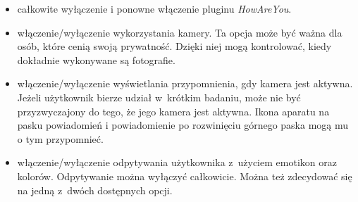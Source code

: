 \begin{itemize}
	\item całkowite wyłączenie i ponowne włączenie pluginu \textit{HowAreYou}.
	
	\item włączenie/wyłączenie wykorzystania kamery. Ta opcja może być ważna dla osób, które cenią swoją prywatność. Dzięki niej mogą kontrolować, kiedy dokładnie wykonywane są fotografie.
	
	\item włączenie/wyłączenie wyświetlania przypomnienia, gdy kamera jest aktywna. Jeżeli użytkownik bierze udział w~krótkim badaniu, może nie być przyzwyczajony do tego, że jego kamera jest aktywna. Ikona aparatu na pasku powiadomień i powiadomienie po rozwinięciu górnego paska mogą mu o tym przypomnieć.
	
	\item włączenie/wyłączenie odpytywania użytkownika z~użyciem emotikon oraz kolorów. Odpytywanie można wyłączyć całkowicie. Można też zdecydować się na jedną z~dwóch dostępnych opcji.
	

\end{itemize}
